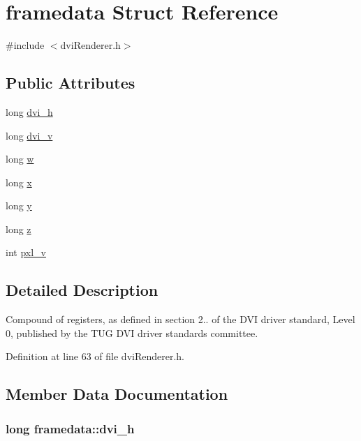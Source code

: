 \hypertarget{structframedata}{\section{framedata Struct Reference}
\label{structframedata}
}


{\ttfamily \#include $<$dvi\+Renderer.\+h$>$}

\subsection*{Public Attributes}
\begin{DoxyCompactItemize}
\item 
long \hyperlink{structframedata_a530699c241126f99b81cee11c2c1c4e4}{dvi\+\_\+h}
\item 
long \hyperlink{structframedata_a9497085c5712ee20cc25eaa37ea902b6}{dvi\+\_\+v}
\item 
long \hyperlink{structframedata_a41ba8896ec8b4ea0765b13c36fd9d18e}{w}
\item 
long \hyperlink{structframedata_a487a6e23e33001a732d8ed5c6f245f1d}{x}
\item 
long \hyperlink{structframedata_a383e2dc0b450b26619b86c9025c6ecae}{y}
\item 
long \hyperlink{structframedata_a563f47ad708ba389b24d1d89a63a7ec4}{z}
\item 
int \hyperlink{structframedata_a0e7316fa88b0240baa7ce526650131a9}{pxl\+\_\+v}
\end{DoxyCompactItemize}


\subsection{Detailed Description}
Compound of registers, as defined in section 2.. of the D\+V\+I driver standard, Level 0, published by the T\+U\+G D\+V\+I driver standards committee. 

Definition at line 63 of file dvi\+Renderer.\+h.



\subsection{Member Data Documentation}
\hypertarget{structframedata_a530699c241126f99b81cee11c2c1c4e4}{
\subsubsection[{dvi\+\_\+h}]{\setlength{\rightskip}{0pt plus 5cm}long framedata\+::dvi\+\_\+h}}\label{structframedata_a530699c241126f99b81cee11c2c1c4e4}


